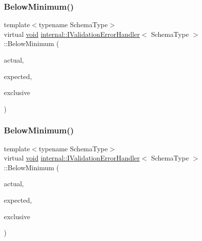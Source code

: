 \mbox{\label{classinternal_1_1IValidationErrorHandler_a5ad9849c01a0bfa923d37ef2f1b4c933}} 
\subsubsection{\texorpdfstring{Below\+Minimum()}{BelowMinimum()}\hspace{0.1cm}{\footnotesize\ttfamily [1/3]}}
{\footnotesize\ttfamily template$<$typename Schema\+Type$>$ \\
virtual \hyperlink{imgui__impl__opengl3__loader_8h_ac668e7cffd9e2e9cfee428b9b2f34fa7}{void} \hyperlink{classinternal_1_1IValidationErrorHandler}{internal\+::\+I\+Validation\+Error\+Handler}$<$ Schema\+Type $>$\+::Below\+Minimum (\begin{DoxyParamCaption}\item[{\hyperlink{stdint_8h_a414156feea104f8f75b4ed9e3121b2f6}{int64\+\_\+t}}]{actual,  }\item[{const \hyperlink{classinternal_1_1IValidationErrorHandler_a22eda6c4ea9537f1ba00d76af052649a}{S\+Value} \&}]{expected,  }\item[{bool}]{exclusive }\end{DoxyParamCaption})\hspace{0.3cm}{\ttfamily [pure virtual]}}

\mbox{\label{classinternal_1_1IValidationErrorHandler_aa7bbfd1a69ba08ae31f87cb96ab5ec04}} 
\subsubsection{\texorpdfstring{Below\+Minimum()}{BelowMinimum()}\hspace{0.1cm}{\footnotesize\ttfamily [2/3]}}
{\footnotesize\ttfamily template$<$typename Schema\+Type$>$ \\
virtual \hyperlink{imgui__impl__opengl3__loader_8h_ac668e7cffd9e2e9cfee428b9b2f34fa7}{void} \hyperlink{classinternal_1_1IValidationErrorHandler}{internal\+::\+I\+Validation\+Error\+Handler}$<$ Schema\+Type $>$\+::Below\+Minimum (\begin{DoxyParamCaption}\item[{\hyperlink{stdint_8h_aec6fcb673ff035718c238c8c9d544c47}{uint64\+\_\+t}}]{actual,  }\item[{const \hyperlink{classinternal_1_1IValidationErrorHandler_a22eda6c4ea9537f1ba00d76af052649a}{S\+Value} \&}]{expected,  }\item[{bool}]{exclusive }\end{DoxyParamCaption})\hspace{0.3cm}{\ttfamily [pure virtual]}}

